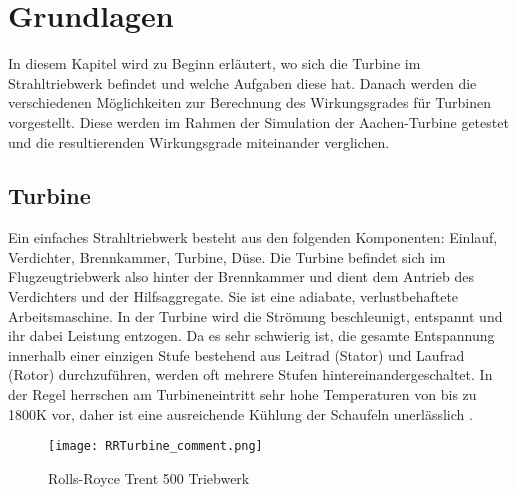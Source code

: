 \chapter{Grundlagen}
\label{cha:grundlagen}
In diesem Kapitel wird zu Beginn erläutert, wo sich die Turbine im Strahltriebwerk befindet und welche Aufgaben diese hat. Danach werden die verschiedenen Möglichkeiten zur Berechnung des Wirkungsgrades für Turbinen vorgestellt. Diese werden im Rahmen der Simulation der Aachen-Turbine getestet und die resultierenden Wirkungsgrade miteinander verglichen.

\section{Turbine}
Ein einfaches Strahltriebwerk besteht aus den folgenden Komponenten: Einlauf, Verdichter, Brennkammer, Turbine, Düse. Die Turbine befindet sich im Flugzeugtriebwerk also hinter der Brennkammer und dient dem Antrieb des Verdichters und der Hilfsaggregate. Sie ist eine adiabate, verlustbehaftete Arbeitsmaschine. In der Turbine wird die Strömung beschleunigt, entspannt und ihr dabei Leistung entzogen. Da es sehr schwierig ist, die gesamte Entspannung innerhalb einer einzigen Stufe bestehend aus Leitrad (Stator) und Laufrad (Rotor) durchzuführen, werden oft mehrere Stufen hintereinandergeschaltet. In der Regel herrschen am Turbineneintritt sehr hohe Temperaturen von bis zu 1800K vor, daher ist eine ausreichende Kühlung der Schaufeln unerlässlich \cite{GLR-Skript}.


\begin{figure}[htbp]
	\centering
	\texttt{[image: RRTurbine\_comment.png]}
	\caption{Rolls-Royce Trent 500 Triebwerk \cite{RRFlickr}} \label{fig:RRTurbine}
\end{figure} 


